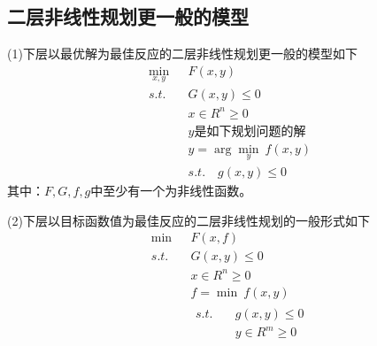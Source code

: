     \subsection{二层非线性规划更一般的模型}
        \par
        (1)下层以最优解为最佳反应的二层非线性规划更一般的模型如下
        \begin{align*}
            \mathop{\min}\limits_{x,y}\ &F(x,y)\\
            s.t.\quad & G(x,y)\leqslant 0\\
            & x\in R^n\geqslant 0\\
            &y\text{是如下规划问题的解}\\
           & y=\arg\mathop{\min}\limits_{y}\ f(x,y)\\
           &s.t.\quad g(x,y) \leqslant 0
        \end{align*}
        其中：$F,G,f,g$中至少有一个为非线性函数。
        \par
        (2)下层以目标函数值为最佳反应的二层非线性规划的一般形式如下
        \begin{align*}
            \mathop{\min}\  &F(x,f)\\
            s.t.\quad & G(x,y)\leqslant 0\\
            & x\in R^n\geqslant 0\\
            &f=\mathop{\min}\ f(x,y)\\
            & \begin{aligned}
            s.t. \quad &g(x,y)\leqslant 0\\
            & y\in R^m\geqslant 0
            \end{aligned}
        \end{align*}


% 
